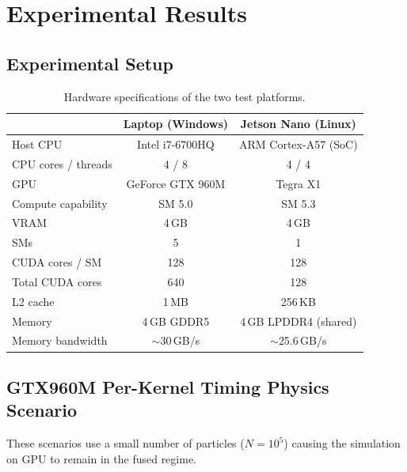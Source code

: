\section{Experimental Results}
\label{sec:results}

\subsection{Experimental Setup}

\begin{table}[H]
  \caption{Hardware specifications of the two test platforms.}
  \label{tab:hardware}
  \centering
  \scriptsize
  \begin{tabular}{@{}lcc@{}}
    \toprule
    & \textbf{Laptop (Windows)} & \textbf{Jetson Nano (Linux)} \\
    \midrule
    Host CPU           & Intel i7-6700HQ & ARM Cortex-A57 (SoC) \\
    CPU cores / threads & 4 / 8 & 4 / 4 \\
    GPU                & GeForce GTX 960M & Tegra X1 \\
    Compute capability & SM 5.0 & SM 5.3 \\
    VRAM               & 4\,GB & 4\,GB \\
    SMs                & 5      & 1 \\
    CUDA cores / SM    & 128    & 128 \\
    Total CUDA cores   & 640    & 128 \\
    L2 cache           & 1\,MB  & 256\,KB \\
    Memory             & 4\,GB GDDR5 & 4\,GB LPDDR4 (shared) \\
    Memory bandwidth   & $\sim$30\,GB/s & $\sim$25.6\,GB/s \\
    \bottomrule
  \end{tabular}
\end{table}

\subsection{GTX960M Per-Kernel Timing Physics Scenario}

These scenarios use a small number of particles ($N = 10^5$)
causing the simulation on GPU to remain in the fused regime.

